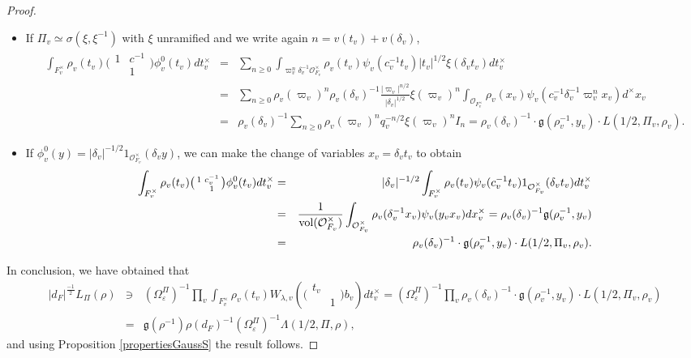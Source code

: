 \documentclass{amsart}
\theoremstyle{definition}
\theoremstyle{remark}
\numberwithin{equation}{section}
\newcommand{\cO}{{\mathcal O}}
\begin{document}
\begin{proof}
\begin{itemize}
 \item If $\Pi_v\simeq\sigma(\xi,\xi^{-1})$ with $\xi$ unramified and we write again $n=v(t_v)+v(\delta_v)$,
    \begin{eqnarray*}
        \int_{F_v^\times}\rho_v(t_v)\big(\begin{smallmatrix}
    1&c^{-1}\\&1
\end{smallmatrix}\big)\phi_v^0(t_v)dt_v^\times&=&\sum_{n\geq 0}\int_{\varpi_v^{n}\delta_v^{-1}\cO_{F_v}^\times}\rho_v(t_v)\psi_v(c_v^{-1}t_v)|t_v|^{1/2}\xi(\delta_vt_v)dt_v^\times\\
        &=&\sum_{n\geq 0}\rho_v(\varpi_v)^{n}\rho_{v}(\delta_v)^{-1}\frac{|\varpi_v|^{n/2}}{|\delta_v|^{1/2}}\xi(\varpi_v)^n\int_{\cO_{F_v^{\times}}}\rho_v(x_v)\psi_v(c_v^{-1}\delta_{v}^{-1}\varpi_v^{n}x_v)d^\times x_v\\
        &=&\rho_v(\delta_v)^{-1}\sum_{n\geq 0}\rho_v(\varpi_v)^{n}q_v^{-n/2}\xi(\varpi_v)^n I_n=\rho_v(\delta_v)^{-1}\cdot \mathfrak{g}(\rho_v^{-1},y_v)\cdot L(1/2,\Pi_v,\rho_v).
    \end{eqnarray*}
    
    \item If $\phi^0_v(y)=|\delta_v|^{-1/2}1_{\cO^\times_{F_v}}(\delta_vy)$, we can make the change of variables $x_v=\delta_v t_v$ to obtain
    \begin{eqnarray*}
        \int_{F_v^\times}\rho_v(t_v)\big(\begin{smallmatrix}
    1&c_v^{-1}\\&1
\end{smallmatrix}\big)\phi_v^0(t_v)dt_v^\times&=&|\delta_v|^{-1/2}\int_{F_v^\times}\rho_v(t_v)\psi_v(c_v^{-1}t_v)1_{\cO^\times_{F_v}}(\delta_vt_v)dt_v^\times\\
&=&\frac{1}{{\rm vol}(\cO_{F_v}^\times)}\int_{\cO_{F_v}^\times}\rho_v(\delta_{v}^{-1}x_v)\psi_v(y_vx_v)dx_v^\times=\rho_v(\delta_v)^{-1}\mathfrak{g}(\rho_v^{-1},y_v)\\
&=&\rho_v(\delta_v)^{-1}\cdot\mathfrak{g}(\rho_v^{-1},y_v)\cdot L(1/2,\Pi_v,\rho_v).
    \end{eqnarray*}
\end{itemize}
In conclusion, we have obtained that 
\begin{eqnarray*}
|d_F|^{\frac{-1}{2}}L_\Pi(\rho)&\ni&(\Omega_\varepsilon^\Pi)^{-1}\prod_v\int_{F_v^\times}\rho_v(t_v)W_{\lambda,v}\left(\big(\begin{smallmatrix}t_v     &  \\     & 1    
\end{smallmatrix}\big)b_v\right)dt_v^\times=(\Omega_\varepsilon^\Pi)^{-1}\prod_v\rho_v(\delta_v)^{-1}\cdot\mathfrak{g}(\rho_v^{-1},y_v)\cdot L(1/2,\Pi_v,\rho_v)\\
&=&\mathfrak{g}(\rho^{-1})\rho(d_F)^{-1}(\Omega_\varepsilon^\Pi)^{-1}\Lambda(1/2,\Pi, \rho),
\end{eqnarray*}
and using Proposition \ref{propertiesGaussS} the result follows.

\end{proof}
\end{document}
